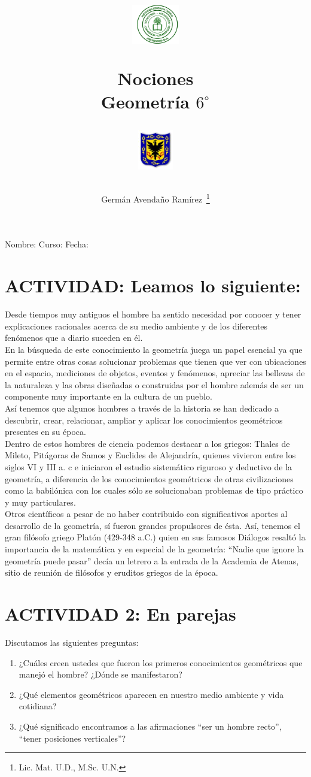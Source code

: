 \documentclass[twoside]{article}
\author{Germ\'an Avenda\~no Ram\'irez~\thanks{Lic. Mat. U.D., M.Sc. U.N.}}
\title{\begin{minipage}{.2\textwidth}
\includegraphics[height=1.75cm]{Images/logo-colegio.png}\end{minipage}
\begin{minipage}{.55\textwidth}
\begin{center}
Nociones\\
Geometría $6^{\circ}$
\end{center}
\end{minipage}\hfill
\begin{minipage}{.2\textwidth}
\includegraphics[height=1.75cm]{Images/logo-sed.png} 
\end{minipage}}
\date{}
\begin{document}
\maketitle
Nombre: \hrulefill Curso: \underline{\hspace*{44pt}} Fecha: \underline{\hspace*{2.5cm}}
\section{ACTIVIDAD: Leamos lo siguiente:}
Desde tiempos muy antiguos el hombre ha sentido necesidad por conocer y tener explicaciones racionales acerca de su medio ambiente y de los diferentes fenómenos que a diario suceden en él.\\

En la búsqueda de este conocimiento la geometría juega un papel esencial ya que permite entre otras cosas solucionar problemas que tienen que ver con ubicaciones en el espacio, mediciones de objetos, eventos y fenómenos, apreciar las bellezas de la naturaleza y las obras diseñadas o construidas por el hombre además de ser un componente muy importante en la cultura de un pueblo.\\

Así tenemos que algunos hombres a través de la historia se han dedicado a descubrir, crear, relacionar, ampliar y aplicar los conocimientos geométricos presentes en su época.\\

Dentro de estos hombres de ciencia podemos destacar a los griegos: Thales de Mileto, Pitágoras de Samos y Euclides de Alejandría, quienes vivieron entre los siglos VI y III a. c e iniciaron el estudio sistemático riguroso y deductivo de la geometría, a diferencia de los conocimientos geométricos de otras civilizaciones como la babilónica con los cuales sólo se solucionaban problemas de tipo práctico y muy particulares.\\

Otros científicos a pesar de no haber contribuido con significativos aportes al desarrollo de la geometría, sí fueron grandes propulsores de ésta. Así, tenemos el gran filósofo griego Platón (429-348 a.C.) quien en sus famosos Diálogos resaltó la importancia de la matemática y en especial de la geometría: ``Nadie que ignore la geometría puede pasar'' decía un letrero a la entrada de la Academia de Atenas, sitio de reunión de
filósofos y eruditos griegos de la época.\\

\section{ACTIVIDAD 2: En parejas}
Discutamos las siguientes preguntas:
\begin{enumerate}
\item ¿Cuáles creen ustedes que fueron los primeros conocimientos geométricos que
manejó el hombre? ¿Dónde se manifestaron?
\item ¿Qué elementos geométricos aparecen en nuestro medio ambiente y vida cotidiana?
\item ¿Qué significado encontramos a las afirmaciones ``ser un hombre recto'', ``tener posiciones verticales''?
\end{enumerate}
\end{document}
